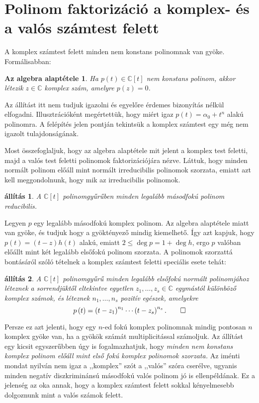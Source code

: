 \documentclass[9pt, a4paper, showtrims]{memoir}
\makeatletter
\renewenvironment{proof}[1][\proofname]
    {\par\pushQED{\qed}%
    \normalfont \topsep6\p@\@plus6\p@\relax
    \trivlist
    \item[\hskip\labelsep
        \itshape
    #1\@addpunct{:}]\ignorespaces}
    {\popQED\endtrivlist\@endpefalse}
\theoremstyle{plain}
\newtheorem{proposition}{állítás}[chapter]
\newtheorem*{FA}{Az algebra alaptétele}
\theoremstyle{remark}
\theoremstyle{definition}
\makeatother
\begin{document}
\section{Polinom faktorizáció a komplex- és a valós számtest felett}
A komplex számtest felett minden nem konstans polinomnak van gyöke.
Formálisabban:
\begin{FA}
    Ha $p\left( t \right)\in\mathbb{C}[t]$ nem konstans polinom,
    akkor létezik $z\in\mathbb{C}$ komplex szám, 
    amelyre $p\left( z \right)=0$.
\end{FA}
Az állítást itt nem tudjuk igazolni és egyelőre érdemes bizonyítás nélkül elfogadni.
Illusztrációként megértettük, hogy miért igaz $p\left( t \right)=\alpha_0+t^n$ alakú polinomra.
A felépítés jelen pontján tekintsük a komplex számtest egy még nem igazolt tulajdonságának.

Most összefoglaljuk, hogy az algebra alaptétele mit jelent a komplex test feletti, majd a valós test feletti polinomok
faktorizációjára nézve.
Láttuk, hogy minden normált polinom előáll mint normált irreducibilis polinomok szorzata,
emiatt azt kell meggondolnunk, hogy mik az irreducibilis polinomok.
\begin{proposition}
    A $\mathbb{C}\left[ t \right]$ polinomgyűrűben minden legalább másodfokú polinom reducibilis.
\end{proposition}
\begin{proof}
    Legyen $p$ egy legalább másodfokú komplex polinom.
    Az algebra alaptétele miatt van gyöke, és
    tudjuk hogy a gyöktényező mindig kiemelhető.
    Így azt kapjuk, hogy $p(t)=\left( t-z \right)h\left( t \right)$ alakú,
    emiatt $2\leq\deg p=1+\deg h$, ergo
    $p$ valóban előállt mint két legalább elsőfokú polinom szorzata.
\end{proof}
A polinomok szorzattá bontásáról szóló tételnek a komplex számtest feletti speciális esete tehát:
\begin{proposition}\label{pr:PolFact}
    A $\mathbb{C}[t]$ polinomgyűrű minden legalább elsőfokú normált polinomjához léteznek
    a sorrendjüktől eltekintve egyetlen $z_1,\dots,z_s\in\mathbb{C}$ egymástól különböző komplex számok,
    és léteznek $n_1,\dots,n_s$ pozitív egészek, 
    amelyekre
    \[
        p\left( t \right)=
        \left( t-z_1 \right)^{n_1}
        \cdots
        \left( t-z_s\right)^{n_s}.\qedhere
    \]
\end{proposition}
Persze ez azt jelenti, hogy egy $n$-ed fokú komplex polinomnak mindig pontosan $n$ komplex gyöke van, 
ha a gyökök számát multiplicitással számoljuk.
Az állítást egy kicsit egyszerűbben úgy is fogalmazhatjuk, 
hogy 
\emph{
    minden nem konstans komplex polinom előáll mint első fokú komplex polinomok szorzata.
}
Az iménti mondat nyilván nem igaz a ,,komplex'' szót a ,,valós'' szóra cserélve, 
ugyanis minden negatív diszkriminánsú másodfokú valós polinom jó is ellenpéldának.
Ez a jelenség az oka annak, 
hogy a komplex számtest felett sokkal kényelmesebb dolgoznunk mint a valós számok felett.
\end{document}
